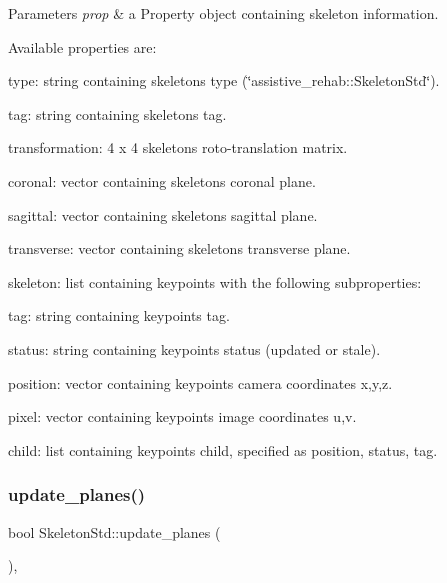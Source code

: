 \begin{DoxyParams}{Parameters}
{\em prop} & a Property object containing skeleton information.\\
\hline
\end{DoxyParams}
Available properties are\+:
\begin{DoxyItemize}
\item type\+: string containing skeleton\textquotesingle{}s type (\char`\"{}assistive\+\_\+rehab\+::\+Skeleton\+Std\char`\"{}).
\item tag\+: string containing skeleton\textquotesingle{}s tag.
\item transformation\+: 4 x 4 skeleton\textquotesingle{}s roto-\/translation matrix.
\item coronal\+: vector containing skeleton\textquotesingle{}s coronal plane.
\item sagittal\+: vector containing skeleton\textquotesingle{}s sagittal plane.
\item transverse\+: vector containing skeleton\textquotesingle{}s transverse plane.
\item skeleton\+: list containing keypoints with the following subproperties\+:
\begin{DoxyItemize}
\item tag\+: string containing keypoint\textquotesingle{}s tag.
\item status\+: string containing keypoint\textquotesingle{}s status (updated or stale).
\item position\+: vector containing keypoint\textquotesingle{}s camera coordinates x,y,z.
\item pixel\+: vector containing keypoint\textquotesingle{}s image coordinates u,v.
\item child\+: list containing keypoint\textquotesingle{}s child, specified as position, status, tag. 
\end{DoxyItemize}
\end{DoxyItemize}\mbox{\label{classassistive__rehab_1_1SkeletonStd_a5769bc6fd407118c866b57b869d672ca}} 
\subsubsection{\texorpdfstring{update\+\_\+planes()}{update\_planes()}}
{\footnotesize\ttfamily bool Skeleton\+Std\+::update\+\_\+planes (\begin{DoxyParamCaption}{ }\end{DoxyParamCaption})\hspace{0.3cm}{\ttfamily [override]}, {\ttfamily [virtual]}}



